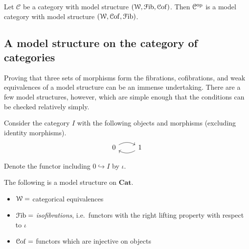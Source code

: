 \documentclass[main.tex]{subfiles}
\begin{document}
\begin{example}
\begin{enumerate}


  \end{enumerate}
\end{example}

\begin{example}
  \label{eg:opposite_model_category}
  Let $\mathcal{C}$ be a category with model structure $(\mathcal{W}, \mathcal{F}\mathrm{ib}, \mathcal{C}\mathrm{of})$. Then $\mathcal{C}^{\mathrm{op}}$ is a model category with model structure $(\mathcal{W}, \mathcal{C}\mathrm{of}, \mathcal{F}\mathrm{ib})$.
\end{example}

\subsection{A model structure on the category of categories}
\label{ssc:a_model_structure_on_the_category_of_categories}

Proving that three sets of morphisms form the fibrations, cofibrations, and weak equivalences of a model structure can be an immense undertaking. There are a few model structures, however, which are simple enough that the conditions can be checked relatively simply.

Consider the category $I$ with the following objects and morphisms (excluding identity morphisms).
\begin{equation*}
  \begin{tikzcd}
    0
    \arrow[r, bend left]
    & 1
    \arrow[l, bend left]
  \end{tikzcd}
\end{equation*}

Denote the functor including $0 \hookrightarrow I$ by $\iota$.

The following is a model structure on $\mathbf{Cat}$.
\begin{itemize}
  \item $\mathcal{W} =$ categorical equivalences

  \item $\mathcal{F}\mathrm{ib} =$ \emph{isofibrations}, i.e.\ functors with the right lifting property with respect to $\iota$

  \item $\mathcal{C}\mathrm{of} =$ functors which are injective on objects
\end{itemize}
\end{document}
